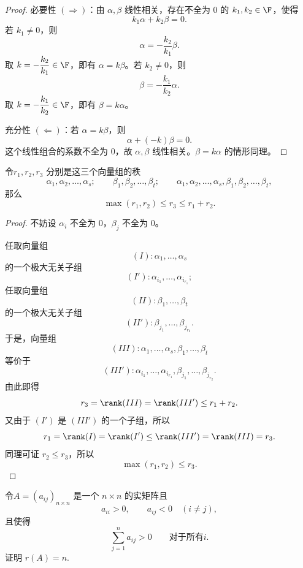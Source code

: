 \begin{proof}
	必要性 $(\Rightarrow)$：由 $\alpha,\beta$ 线性相关，存在不全为 $0$ 的 $k_1,k_2\in\F$，使得
	\[
	k_1\alpha+k_2\beta=0.
	\]
	若 $k_1\neq0$，则
	\[
	\alpha=-\frac{k_2}{k_1}\beta.
	\]
	取 $k=-\dfrac{k_2}{k_1}\in\F$，即有 $\alpha=k\beta$。若 $k_2\neq0$，则
	\[
	\beta=-\frac{k_1}{k_2}\alpha.
	\]
	取 $k=-\dfrac{k_1}{k_2}\in\F$，即有 $\beta=k\alpha$。
	
	充分性 $(\Leftarrow)$：若 $\alpha=k\beta$，则
	\[
	\alpha+(-k)\beta=0.
	\]
	这个线性组合的系数不全为 $0$，故 $\alpha,\beta$ 线性相关。$\beta=k\alpha$ 的情形同理。
\end{proof}
\begin{problem}
	令$r_1,r_2,r_3$ 分别是这三个向量组的秩
	\[
	\alpha_1,\alpha_2,\ldots,\alpha_s;
	\qquad
	\beta_1,\beta_2,\ldots,\beta_t;
	\qquad
	\alpha_1,\alpha_2,\ldots,\alpha_s,
	\beta_1,\beta_2,\ldots,\beta_t,
	\]
	那么
	\[
	\max(r_1,r_2)\leq r_3\leq r_1+r_2.
	\]
\end{problem}

\begin{proof}
	不妨设 $\alpha_i$ 不全为 $0$，$\beta_j$ 不全为 $0$。
	
	任取向量组
	\[
	(I):\alpha_1,\ldots,\alpha_s
	\]
	的一个极大无关子组
	\[
	(I'):\alpha_{i_1},\ldots,\alpha_{i_{r_1}};
	\]
	任取向量组
	\[
	(II):\beta_1,\ldots,\beta_t
	\]
	的一个极大无关子组
	\[
	(II'):\beta_{j_1},\ldots,\beta_{j_{r_2}}.
	\]
	于是，向量组
	\[
	(III):\alpha_1,\ldots,\alpha_s,\beta_1,\ldots,\beta_t
	\]
	等价于
	\[
	(III'):\alpha_{i_1},\ldots,\alpha_{i_{r_1}},
	\beta_{j_1},\ldots,\beta_{j_{r_2}}.
	\]
	由此即得
	\[
	r_3=\rank(III)=\rank(III')\leq r_1+r_2.
	\]
	又由于 $(I')$ 是 $(III')$ 的一个子组，所以
	\[
	r_1=\rank(I)=\rank(I')
	\leq\rank(III')=\rank(III)=r_3.
	\]
	同理可证 $r_2\leq r_3$，所以
	\[
	\max(r_1,r_2)\leq r_3.
	\]
\end{proof}



\begin{problem}
	令$A=(a_{ij})_{n\times n}$ 是一个 $n\times n$ 的实矩阵且
	\[
	a_{ii}>0,\qquad a_{ij}<0\quad(i\neq j),
	\]
	且使得
	\[
	\sum_{j=1}^n a_{ij}>0
	\qquad\text{对于所有}i.
	\]
	证明 $r(A)=n$.
\end{problem}

